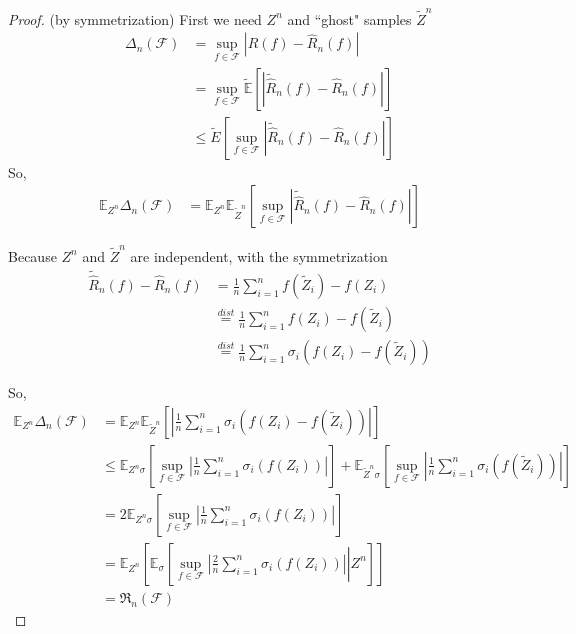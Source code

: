 \documentclass[10pt]{article}
\newcommand{\F}{\mathcal{F}}
\newcommand{\Rad}{\mathfrak R_n}
\renewcommand{\hat}{\widehat}
\renewcommand{\tilde}{\widetilde}
\begin{document}
\begin{proof}
(by symmetrization) First we need $Z^n$ and ``ghost" samples $\tilde{Z}^n$
\begin{align*}
\Delta_n(\F) &= \sup_{f\in\mathcal{F}} | R(f) - \hat R_n(f) |\\
	&= \sup_{f\in\mathcal{F}} \tilde{\mathbb{E}} \left[ | \tilde{\hat R}_n(f) - \hat R_n (f) | \right]\\
	&\le \tilde E \left[ \sup_{f\in\mathcal{F}} | \tilde{\hat R}_n (f) - \hat R_n (f) | \right]
\end{align*}
So,
\begin{align*}
\mathbb{E}_{Z^n} \Delta_n(\F) &= \mathbb{E}_{Z^n} \mathbb{E}_{\tilde Z^n} \left[ \sup_{f\in\mathcal{F}} | \tilde{\hat R}_n(f) - \hat R_n(f) | \right]
\end{align*}

Because $Z^n$ and $\tilde Z^n$ are independent, with the symmetrization
\begin{align*}
\tilde{\hat R}_n(f) - \hat R_n(f) &= \frac{1}{n} \sum_{i=1}^{n} f(\tilde Z_i) -f(Z_i)\\
&\overset{dist}{=} \frac{1}{n} \sum_{i=1}^{n} f(Z_i) - f(\tilde Z_i)\\
&\overset{dist}{=} \frac{1}{n} \sum_{i=1}^{n} \sigma_i ( f(Z_i) - f(\tilde Z_i) )
\end{align*}

So,
\begin{align*}
\mathbb{E}_{Z^n} \Delta_n(\F) &= \mathbb{E}_{Z^n} \mathbb{E}_{\tilde Z^n} \left[ |\frac{1}{n} \sum_{i=1}^{n} \sigma_i ( f(Z_i) - f(\tilde Z_i) )| \right]\\
 &\le \mathbb{E}_{Z^n\sigma} \left[ \sup_{f\in\mathcal{F}} |\frac{1}{n} \sum_{i=1}^{n} \sigma_i ( f(Z_i) )| \right] + \mathbb{E}_{\tilde Z^n\sigma} \left[ \sup_{f\in\mathcal{F}} |\frac{1}{n} \sum_{i=1}^{n} \sigma_i ( f(\tilde Z_i) )| \right]\\
 &=2 \mathbb{E}_{Z^n\sigma} \left[ \sup_{f\in\mathcal{F}} |\frac{1}{n} \sum_{i=1}^{n} \sigma_i ( f(Z_i) )| \right]\\
 &= \mathbb{E}_{Z^n} \left[ \mathbb{E}_{\sigma} \left[ \left. \sup_{f\in\mathcal{F}} |\frac{2}{n} \sum_{i=1}^{n} \sigma_i ( f(Z_i) )| \right| Z^n \right] \right]\\
 &=\Rad(\F)
\end{align*}
\end{proof}
















\end{document}
